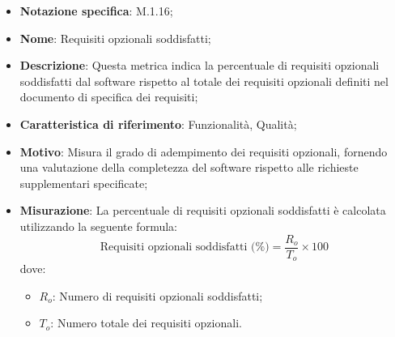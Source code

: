 \begin{itemize}
    \item \textbf{Notazione specifica}: M.1.16;
    \item \textbf{Nome}: Requisiti opzionali soddisfatti;
    \item \textbf{Descrizione}: Questa metrica indica la percentuale di requisiti opzionali soddisfatti dal software rispetto al totale dei requisiti opzionali definiti nel documento di specifica dei requisiti;
    \item \textbf{Caratteristica di riferimento}: Funzionalità, Qualità;
    \item \textbf{Motivo}: Misura il grado di adempimento dei requisiti opzionali, fornendo una valutazione della completezza del software rispetto alle richieste supplementari specificate;
    \item \textbf{Misurazione}: La percentuale di requisiti opzionali soddisfatti è calcolata utilizzando la seguente formula:
    \[
    \text{Requisiti opzionali soddisfatti (\%)} = \frac{R_{o}}{T_{o}} \times 100
    \]
    dove:
    \begin{itemize}
        \item $R_{o}$: Numero di requisiti opzionali soddisfatti;
        \item $T_{o}$: Numero totale dei requisiti opzionali.
    \end{itemize}
\end{itemize}
